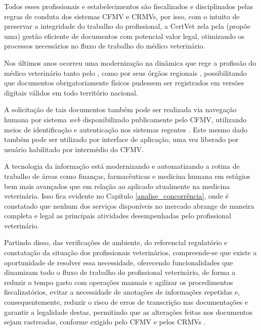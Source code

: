 \documentclass[
    12pt,               %
    openright,          %
    oneside,
    a4paper,            %
    BIBLATEX,           %
    TODO,               %
    english,            %
    brazil              %
    ]{ifsp-spo-inf-ctds}
\begin{document}

    Todos esses profissionais e estabelecimentos são fiscalizados e disciplinados pelas regras de conduta dos sistemas CFMV e CRMVs, por isso, com o intuito de preservar a integridade do trabalho do profissional, a CertVet zela pela (propõe uma) gestão eficiente de documentos com potencial valor legal, otimizando os processos necessários no fluxo de trabalho do médico veterinário.
    
    Nos últimos anos ocorreu uma modernização na dinâmica que rege a profissão do médico veterinário tanto pelo , como por seus órgãos regionais , possibilitando que documentos obrigatoriamente físicos pudessem ser registrados em versões digitais válidos em todo território nacional.

    A solicitação de tais documentos também pode ser realizada via navegação humana por sistema \emph{web} disponibilizado publicamente pelo CFMV, utilizando meios de identificação e autenticação nos sistemas regentes . Este mesmo dado também pode ser utilizado por interface de aplicação, uma vez liberado por usuário habilitado por intermédio do CFMV.

    A tecnologia da informação está modernizando e automatizando a rotina de trabalho de áreas como finanças, farmacêuticas e medicina humana em estágios bem mais avançados que em relação ao aplicado atualmente na medicina veterinária. Isso fica evidente no Capítulo \ref{analise_concorrência}, onde é constatado que nenhum dos serviços disponíveis no mercado abrange de maneira completa e legal as principais atividades desempenhadas pelo profissional veterinário.
 
    Partindo disso, das verificações de ambiente, do referencial regulatório e constatação da situação dos profissionais veterinários, compreende-se que existe a oportunidade de resolver essa necessidade, oferecendo funcionalidades que dinamizam todo o fluxo de trabalho do profissional veterinário, de forma a reduzir o tempo gasto com operações manuais e agilizar os procedimentos fiscalizatórios, evitar a necessidade de anotações de informações repetidas e, consequentemente, reduzir o risco de erros de transcrição nas documentações e garantir a legalidade destas, permitindo que as alterações feitas nos documentos sejam rastreadas, conforme exigido pelo CFMV e pelos CRMVs .
    
\end{document}
